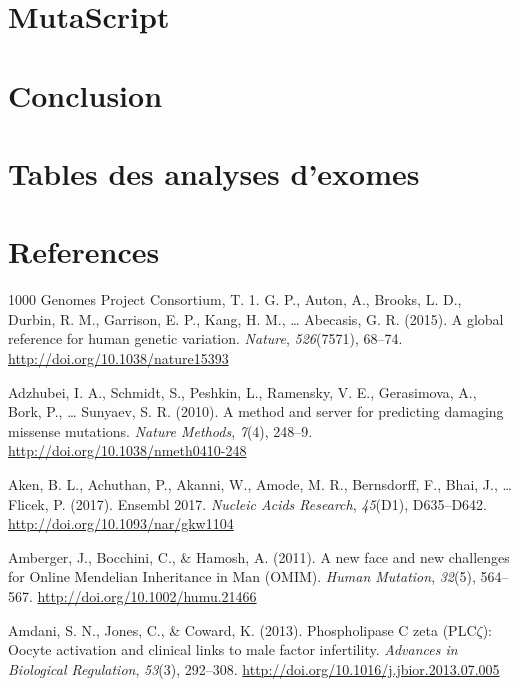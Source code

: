 \documentclass[12pt,twoside]{reedthesis}
\theoremstyle{definition}
\theoremstyle{definition}
\theoremstyle{remark}
\begin{document}
  \chapter{MutaScript}\label{mutascript}
  
  \chapter*{Conclusion}\label{conclusion-1}
  
  \chapter{Tables des analyses d'exomes}\label{sssdd}
  
  \chapter*{References}\label{references}
  
  \hypertarget{refs}{}
  \hypertarget{ref-1000GenomesProjectConsortium2015}{}
  1000 Genomes Project Consortium, T. 1. G. P., Auton, A., Brooks, L. D.,
  Durbin, R. M., Garrison, E. P., Kang, H. M., \ldots{} Abecasis, G. R.
  (2015). A global reference for human genetic variation. \emph{Nature},
  \emph{526}(7571), 68--74. \url{http://doi.org/10.1038/nature15393}
  
  \hypertarget{ref-Adzhubei2010}{}
  Adzhubei, I. A., Schmidt, S., Peshkin, L., Ramensky, V. E., Gerasimova,
  A., Bork, P., \ldots{} Sunyaev, S. R. (2010). A method and server for
  predicting damaging missense mutations. \emph{Nature Methods},
  \emph{7}(4), 248--9. \url{http://doi.org/10.1038/nmeth0410-248}
  
  \hypertarget{ref-Aken2017}{}
  Aken, B. L., Achuthan, P., Akanni, W., Amode, M. R., Bernsdorff, F.,
  Bhai, J., \ldots{} Flicek, P. (2017). Ensembl 2017. \emph{Nucleic Acids
  Research}, \emph{45}(D1), D635--D642.
  \url{http://doi.org/10.1093/nar/gkw1104}
  
  \hypertarget{ref-Amberger2011}{}
  Amberger, J., Bocchini, C., \& Hamosh, A. (2011). A new face and new
  challenges for Online Mendelian Inheritance in Man (OMIM). \emph{Human
  Mutation}, \emph{32}(5), 564--567.
  \url{http://doi.org/10.1002/humu.21466}
  
  \hypertarget{ref-Amdani2013}{}
  Amdani, S. N., Jones, C., \& Coward, K. (2013). Phospholipase C zeta
  (PLC\(\zeta\)): Oocyte activation and clinical links to male factor
  infertility. \emph{Advances in Biological Regulation}, \emph{53}(3),
  292--308. \url{http://doi.org/10.1016/j.jbior.2013.07.005}
  
\end{document}

